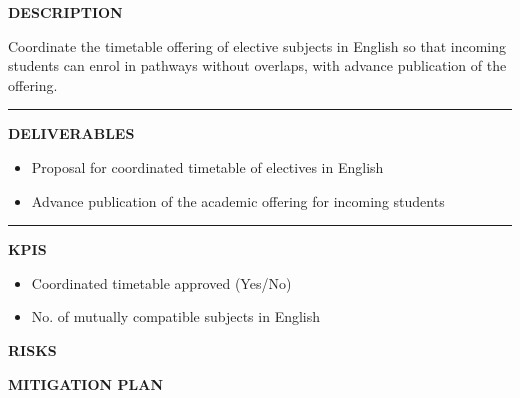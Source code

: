 \documentclass[11pt,a4paper]{scrreprt}
\newcommand{\fieldlabel}[1]{%
  {\footnotesize\sffamily\bfseries\color{mutedcolor}\MakeUppercase{#1}}\par\nopagebreak[4]
}
\newcommand{\fieldsep}{\vspace{3pt}\noindent\textcolor{bordercolor}{\rule{\linewidth}{0.4pt}}\vspace{3pt}\par}
\begin{document}
\begin{tcolorbox}[pabox={fgcolor}{A.P.3.1 \enspace\textbullet\enspace Assign a Coordinated Timetable for Electives in English}]

\fieldlabel{Description}
{\small Coordinate the timetable offering of elective subjects in English so that incoming students can enrol in pathways without overlaps, with advance publication of the offering.}\par
\fieldsep
\fieldlabel{Deliverables}
{\small \begin{itemize}[noitemsep,topsep=2pt]
\item Proposal for coordinated timetable of electives in English
\item Advance publication of the academic offering for incoming students
\end{itemize}}\par
\fieldsep
\fieldlabel{KPIs}
{\small \begin{itemize}[noitemsep,topsep=2pt]
\item Coordinated timetable approved (Yes/No)
\item No. of mutually compatible subjects in English
\end{itemize}}\par
\end{tcolorbox}
\begin{tcolorbox}[riskbox]
{\footnotesize\sffamily\bfseries\color{red!50!black} RISKS}\par{}
\end{tcolorbox}
\begin{tcolorbox}[mitbox]
{\footnotesize\sffamily\bfseries\color{green!40!black} MITIGATION PLAN}\par{}
\end{tcolorbox}
\vspace{8pt}
\end{document}
